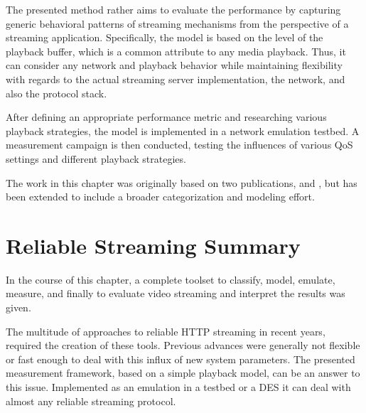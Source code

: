 The presented method rather aims to evaluate the performance by capturing generic behavioral patterns of streaming mechanisms from the perspective of a streaming application. Specifically, the model is based on the level of the playback buffer, which is a common attribute to any media playback. Thus, it can consider any network and playback behavior while maintaining flexibility with regards to the actual streaming server implementation, the network, and also the protocol stack.

After defining an appropriate performance metric and researching various playback strategies, the model is implemented in a network emulation testbed. A measurement campaign is then conducted, testing the influences of various \gls{QoS} settings and different playback strategies. 

The work in this chapter was originally based on two publications, \cite{metzger2011delivery} and \cite{6229739}, but has been extended to include a broader categorization and modeling effort.










\section{Reliable Streaming Summary}
\label{c3:sec:conclusion}

In the course of this chapter, a complete toolset to classify, model, emulate, measure, and finally to evaluate video streaming and interpret the results was given.

The multitude of approaches to reliable \gls{HTTP} streaming in recent years, required the creation of these tools. Previous advances were generally not flexible or fast enough to deal with this influx of new system parameters. The presented measurement framework, based on a simple playback model, can be an answer to this issue. Implemented as an emulation in a testbed or a \gls{DES} it can deal with almost any reliable streaming protocol.


